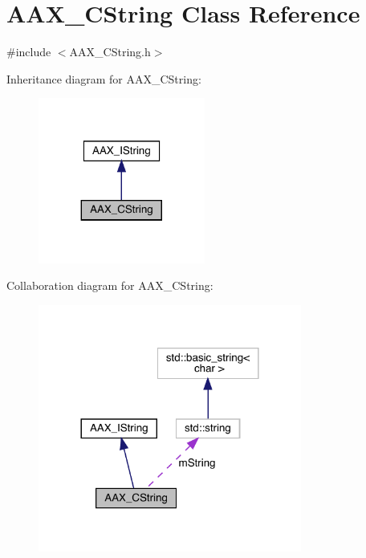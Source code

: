 \hypertarget{a01573}{}\section{A\+A\+X\+\_\+\+C\+String Class Reference}
\label{a01573}


{\ttfamily \#include $<$A\+A\+X\+\_\+\+C\+String.\+h$>$}



Inheritance diagram for A\+A\+X\+\_\+\+C\+String\+:
\nopagebreak
\begin{figure}[H]
\begin{center}
\leavevmode
\includegraphics[width=155pt]{a01572}
\end{center}
\end{figure}


Collaboration diagram for A\+A\+X\+\_\+\+C\+String\+:
\nopagebreak
\begin{figure}[H]
\begin{center}
\leavevmode
\includegraphics[width=245pt]{a01571}
\end{center}
\end{figure}


